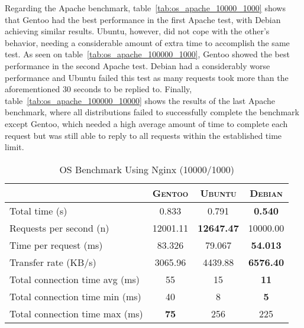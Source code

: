 Regarding the Apache benchmark, table~\ref{tab:os_apache_10000_1000} shows that Gentoo had the best performance in the first Apache test, with Debian achieving similar results. Ubuntu, however, did not cope with the other's behavior, needing a considerable amount of extra time to accomplish the same test. As seen on table~\ref{tab:os_apache_100000_1000}, Gentoo showed the best performance in the second Apache test. Debian had a considerably worse performance and Ubuntu failed this test as many requests took more than the aforementioned 30 seconds to be replied to. Finally, table~\ref{tab:os_apache_100000_10000} shows the results of the last Apache benchmark, where all distributions failed to successfully complete the benchmark except Gentoo, which needed a high average amount of time to complete each request but was still able to reply to all requests within the established time limit.
\begin{table}[ht]
  \centering
  \caption{OS Benchmark Using Nginx (10000/1000)}
  \label{tab:os_nginx_10000_1000}
  
  \begin{tabular}{l|c|c|c}

    & \textbf{\textsc{Gentoo}} & \textbf{\textsc{Ubuntu}} & \textbf{\textsc{Debian}} \\ \hline
    Total time (s) & 0.833 & 0.791 & \textbf{0.540} \\ \hline
    Requests per second (n) & 12001.11 & \textbf{12647.47} & 10000.00 \\ \hline
    Time per request (ms) & 83.326 & 79.067 & \textbf{54.013} \\ \hline
    Transfer rate (KB/s) & 3065.96 & 4439.88 & \textbf{6576.40} \\ \hline
    Total connection time avg (ms) & 55 & 15 & \textbf{11} \\ \hline
    Total connection time min (ms) & 40 & 8 & \textbf{5} \\ \hline
    Total connection time max (ms) & \textbf{75} & 256 & 225 \\
  \end{tabular}
\end{table}

